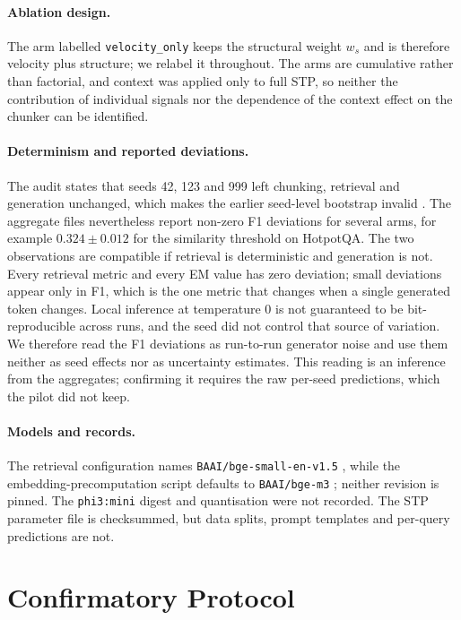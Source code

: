 \documentclass[10pt,a4paper]{article}
\begin{document}
\paragraph{Ablation design.} The arm labelled \texttt{velocity\_only} keeps the structural weight $w_s$ and is therefore velocity plus structure; we relabel it throughout. The arms are cumulative rather than factorial, and context was applied only to full STP, so neither the contribution of individual signals nor the dependence of the context effect on the chunker can be identified.

\paragraph{Determinism and reported deviations.} The audit states that seeds 42, 123 and 999 left chunking, retrieval and generation unchanged, which makes the earlier seed-level bootstrap invalid \cite{efron1993bootstrap}. The aggregate files nevertheless report non-zero F1 deviations for several arms, for example $0.324\pm0.012$ for the similarity threshold on HotpotQA. The two observations are compatible if retrieval is deterministic and generation is not. Every retrieval metric and every EM value has zero deviation; small deviations appear only in F1, which is the one metric that changes when a single generated token changes. Local inference at temperature 0 is not guaranteed to be bit-reproducible across runs, and the seed did not control that source of variation. We therefore read the F1 deviations as run-to-run generator noise and use them neither as seed effects nor as uncertainty estimates. This reading is an inference from the aggregates; confirming it requires the raw per-seed predictions, which the pilot did not keep.

\paragraph{Models and records.} The retrieval configuration names \texttt{BAAI/bge-small-en-v1.5} \cite{xiao2023cpack}, while the embedding-precomputation script defaults to \texttt{BAAI/bge-m3} \cite{chen2024bgem3}; neither revision is pinned. The \texttt{phi3:mini} \cite{abdin2024phi3} digest and quantisation were not recorded. The STP parameter file is checksummed, but data splits, prompt templates and per-query predictions are not.

\section{Confirmatory Protocol}
\label{sec:protocol}
\end{document}
